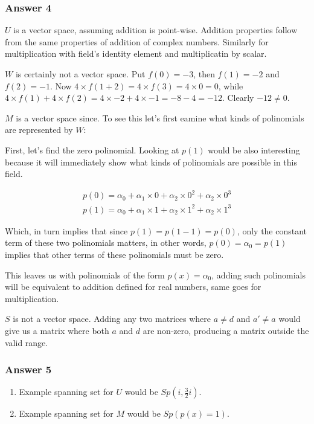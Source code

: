 \documentclass[11pt]{article}
\begin{document}
\subsubsection{Answer 4}
\label{sec-1-3-1}
$U$ is a vector space, assuming addition is point-wise.  Addition properties
follow from the same properties of addition of complex numbers.  Similarly
for multiplication with field's identity element and multiplicatin by scalar.

$W$ is certainly not a vector space.  Put $f(0) = -3$, then $f(1) = -2$ and
$f(2) = -1$.  Now $4 \times f(1 + 2) = 4 \times f(3) = 4 \times 0 = 0$, while
$4 \times f(1) + 4 \times f(2) = 4 \times -2 + 4 \times -1 = -8 - 4 = -12$.
Clearly $-12 \neq 0$.

$M$ is a vector space since.  To see this let's first eamine what kinds of
polinomials are represented by $W$:

First, let's find the zero polinomial.  Looking at $p(1)$ would be also
interesting because it will immediately show what kinds of polinomials are
possible in this field.

\begin{equation*}
  \begin{split}
    p(0)=\alpha_0 + \alpha_1 \times 0 + \alpha_2 \times 0^2 + \alpha_2 \times 0^3 \\
    p(1)=\alpha_0 + \alpha_1 \times 1 + \alpha_2 \times 1^2 + \alpha_2 \times 1^3
  \end{split}
\end{equation*}


Which, in turn implies that since $p(1)=p(1-1)=p(0)$, only the constant term of
these two polinomials matters, in other words, $p(0)=\alpha_0=p(1)$ implies
that other terms of these polinomials must be zero.

This leaves us with polinomials of the form $p(x)=\alpha_0$, adding such
polinomials will be equivalent to addition defined for real numbers, same goes
for multiplication.

$S$ is not a vector space.  Adding any two matrices where $a \neq d$ and $a' \neq a$
would give us a matrix where both $a$ and $d$ are non-zero, producing a matrix
outside the valid range.
\subsubsection{Answer 5}
\label{sec-1-3-2}

\begin{enumerate}
\item Example spanning set for $U$ would be $Sp(i, \frac{3}{2}i)$.
\item Example spanning set for $M$ would be $Sp(p(x)=1)$.
\end{enumerate}
\end{document}
